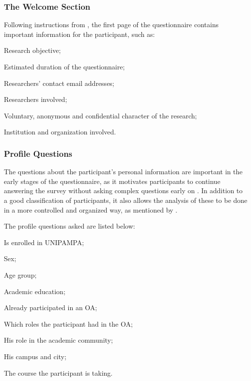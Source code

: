 \subsubsection{The Welcome Section}\label{survey:welcome}

Following instructions from \textcite{kasunic2005designing}, the first page of the questionnaire contains important information for the participant, such as:

\begin{inparaenum}[(i)]
  \item Research objective;
  \item Estimated duration of the questionnaire;
  \item Researchers' contact email addresses;
  \item Researchers involved;
  \item Voluntary, anonymous and confidential character of the research;
  \item Institution and organization involved.
\end{inparaenum}

\subsubsection{Profile Questions}\label{survey:profile-questions}

The questions about the participant's personal information are important in the early stages of the questionnaire, as it motivates participants to continue answering the survey without asking complex questions early on \cite{LMRea}. In addition to a good classification of participants, it also allows the analysis of these to be done in a more controlled and organized way, as mentioned by \textcite{legramante}.

The profile questions asked are listed below:
\begin{inparaenum}[(1)]
  \item Is enrolled in \ac{UNIPAMPA};
  \item Sex;
  \item Age group;
  \item Academic education;
  \item Already participated in an \ac{OA};
  \item Which roles the participant had in the \ac{OA};
  \item His role in the academic community;
  \item His campus and city;
  \item The course the participant is taking.
\end{inparaenum}

